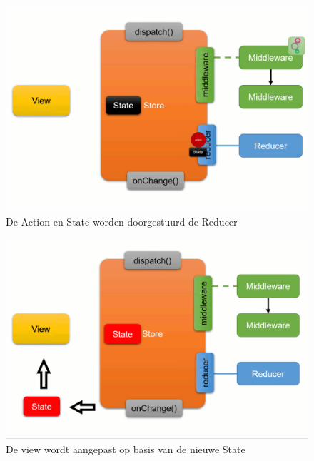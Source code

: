 \begin{figure}[H]
    \centering
    \includegraphics[width=\figureWidthModifier\linewidth]{img/stand-van-zaken/redux-working-detailed-3.png}
    \caption{De Action en State worden doorgestuurd de Reducer \textcite{Boelens2019}}
    \label{fig:redux-working-detailed-3}
\end{figure}

\begin{figure}[H]
    \centering
    \includegraphics[width=\figureWidthModifier\linewidth]{img/stand-van-zaken/redux-working-detailed-4.png}
    \caption{De view wordt aangepast op basis van de nieuwe State \textcite{Boelens2019}}
    \label{fig:redux-working-detailed-4}
\end{figure}

